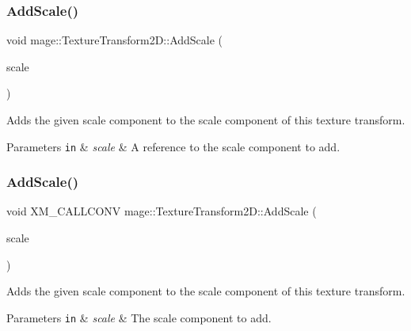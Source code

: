\subsubsection{\texorpdfstring{Add\+Scale()}{AddScale()}\hspace{0.1cm}{\footnotesize\ttfamily [3/4]}}
{\footnotesize\ttfamily void mage\+::\+Texture\+Transform2\+D\+::\+Add\+Scale (\begin{DoxyParamCaption}\item[{const \mbox{\hyperlink{namespacemage_aee4759dedc8def6c6dec26b5c7eddf29}{F32x2}} \&}]{scale }\end{DoxyParamCaption})\hspace{0.3cm}{\ttfamily [noexcept]}}

Adds the given scale component to the scale component of this texture transform.


\begin{DoxyParams}[1]{Parameters}
\mbox{\tt in}  & {\em scale} & A reference to the scale component to add. \\
\hline
\end{DoxyParams}
\mbox{\label{classmage_1_1_texture_transform2_d_a4d6ec837e693847b7c6ec73905a05da8}} 
\subsubsection{\texorpdfstring{Add\+Scale()}{AddScale()}\hspace{0.1cm}{\footnotesize\ttfamily [4/4]}}
{\footnotesize\ttfamily void X\+M\+\_\+\+C\+A\+L\+L\+C\+O\+NV mage\+::\+Texture\+Transform2\+D\+::\+Add\+Scale (\begin{DoxyParamCaption}\item[{F\+X\+M\+V\+E\+C\+T\+OR}]{scale }\end{DoxyParamCaption})\hspace{0.3cm}{\ttfamily [noexcept]}}

Adds the given scale component to the scale component of this texture transform.


\begin{DoxyParams}[1]{Parameters}
\mbox{\tt in}  & {\em scale} & The scale component to add. \\
\hline
\end{DoxyParams}
\mbox{\label{classmage_1_1_texture_transform2_d_a463d665271a4f4ebf81b2771e79190fb}} 
